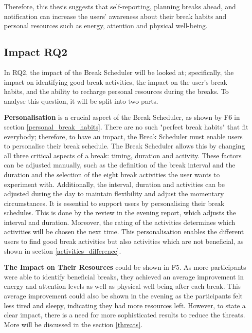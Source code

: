 \documentclass{hasel_thesis}
\begin{document}
Therefore, this thesis suggests that self-reporting, planning breaks ahead, and notification can increase the users' awareness about their break habits and personal resources such as energy, attention and physical well-being.

\subsection{Impact RQ2} \label{RQ2} %
In RQ2, the impact of the Break Scheduler will be looked at; specifically, the impact on identifying good break activities, the impact on the user's break habits, and the ability to recharge personal resources during the breaks. To analyse this question, it will be split into two parts.

\textbf{Personalisation} is a crucial aspect of the Break Scheduler, as shown by F6 in section \ref{personal_break_habits}. There are no such "perfect break habits" that fit everybody; therefore, to have an impact, the Break Scheduler must enable users to personalise their break schedule. The Break Scheduler allows this by changing all three critical aspects of a break: timing, duration and activity. These factors can be adjusted manually, such as the definition of the break interval and the duration and the selection of the eight break activities the user wants to experiment with. Additionally, the interval, duration and activities can be adjusted during the day to maintain flexibility and adjust the momentary circumstances. It is essential to support users by personalising their break schedules. This is done by the review in the evening report, which adjusts the interval and duration. Moreover, the rating of the activities determines which activities will be chosen the next time. This personalisation enables the different users to find good break activities but also activities which are not beneficial, as shown in section \ref{activities_difference}.

\textbf{The Impact on Their Resources} could be shown in F5. As more participants were able to identify beneficial breaks, they achieved an average improvement in energy and attention levels as well as physical well-being after each break. This average improvement could also be shown in the evening as the participants felt less tired and sleepy, indicating they had more resources left. However, to state a clear impact, there is a need for more sophisticated results to reduce the threats. More will be discussed in the section \ref{threats}.
\end{document}
